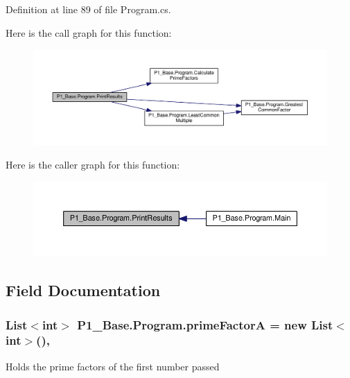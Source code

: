 Definition at line 89 of file Program.\-cs.



Here is the call graph for this function\-:
\nopagebreak
\begin{figure}[H]
\begin{center}
\leavevmode
\includegraphics[width=350pt]{class_p1___base_1_1_program_ae53d2081a28e5cb969cdc26c7e6ffd10_cgraph}
\end{center}
\end{figure}




Here is the caller graph for this function\-:
\nopagebreak
\begin{figure}[H]
\begin{center}
\leavevmode
\includegraphics[width=350pt]{class_p1___base_1_1_program_ae53d2081a28e5cb969cdc26c7e6ffd10_icgraph}
\end{center}
\end{figure}




\subsection{Field Documentation}
\hypertarget{class_p1___base_1_1_program_a5a1d1aaa0c9be4b481faddab1e1ab753}{
\subsubsection[{prime\-Factor\-A}]{\setlength{\rightskip}{0pt plus 5cm}List$<$int$>$ P1\-\_\-\-Base.\-Program.\-prime\-Factor\-A = new List$<$int$>$()\hspace{0.3cm}{\ttfamily [static]}, {\ttfamily [private]}}}\label{class_p1___base_1_1_program_a5a1d1aaa0c9be4b481faddab1e1ab753}
Holds the prime factors of the first number passed 

